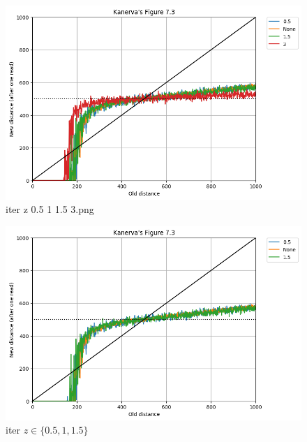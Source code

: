 \documentclass[11pt]{article} %
\begin{document}
\begin{figure}
  \includegraphics[width=\linewidth]{./images02/new-images/iter_z_05_1_15_3.png}
  \caption{iter z  0.5 1 1.5 3.png}
  \label{fig:boat1}
\end{figure}



\begin{figure}
  \includegraphics[width=\linewidth]{./images02/new-images/iter_z_05_1_15.png}
  \caption{iter $z\in \{0.5, 1, 1.5\}$ }
  \label{fig:boat1}
\end{figure}
\end{document}
